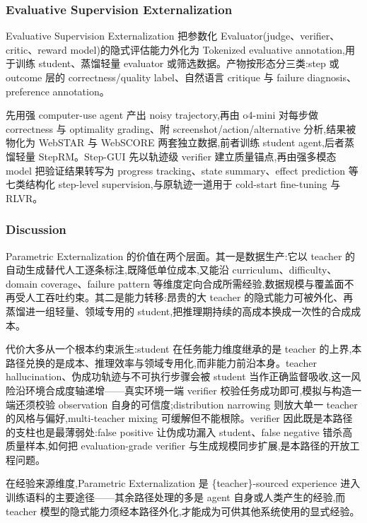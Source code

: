 \subsubsection{Evaluative Supervision Externalization}

Evaluative Supervision Externalization 把参数化 Evaluator(judge、verifier、critic、reward model)的隐式评估能力外化为 Tokenized evaluative annotation,用于训练 student、蒸馏轻量 evaluator 或筛选数据。产物按形态分三类:step 或 outcome 层的 correctness/quality label、自然语言 critique 与 failure diagnosis、preference annotation。

\cite{He25g} 先用强 computer-use agent 产出 noisy trajectory,再由 o4-mini 对每步做 correctness 与 optimality grading、附 screenshot/action/alternative 分析,结果被物化为 WebSTAR 与 WebSCORE 两套独立数据,前者训练 student agent,后者蒸馏轻量 StepRM。Step-GUI \cite{Yan25x} 先以轨迹级 verifier 建立质量锚点,再由强多模态 model 把验证结果转写为 progress tracking、state summary、effect prediction 等七类结构化 step-level supervision,与原轨迹一道用于 cold-start fine-tuning 与 RLVR。




\subsubsection{Discussion}

Parametric Externalization 的价值在两个层面。其一是数据生产:它以 teacher 的自动生成替代人工逐条标注,既降低单位成本,又能沿 curriculum、difficulty、domain coverage、failure pattern 等维度定向合成所需经验,数据规模与覆盖面不再受人工吞吐约束。其二是能力转移:昂贵的大 teacher 的隐式能力可被外化、再蒸馏进一组轻量、领域专用的 student,把推理期持续的高成本换成一次性的合成成本。

代价大多从一个根本约束派生:student 在任务能力维度继承的是 teacher 的上界,本路径兑换的是成本、推理效率与领域专用化,而非能力前沿本身。teacher hallucination、伪成功轨迹与不可执行步骤会被 student 当作正确监督吸收,这一风险沿环境合成度轴递增——真实环境一端 verifier 校验任务成功即可,模拟与构造一端还须校验 observation 自身的可信度;distribution narrowing 则放大单一 teacher 的风格与偏好,multi-teacher mixing 可缓解但不能根除。verifier 因此既是本路径的支柱也是最薄弱处:false positive 让伪成功漏入 student、false negative 错杀高质量样本,如何把 evaluation-grade verifier 与生成规模同步扩展,是本路径的开放工程问题。

在经验来源维度,Parametric Externalization 是 \{teacher\}-sourced experience 进入训练语料的主要途径——其余路径处理的多是 agent 自身或人类产生的经验,而 teacher 模型的隐式能力须经本路径外化,才能成为可供其他系统使用的显式经验。
